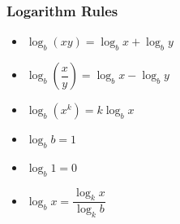 \subsubsection{Logarithm Rules}
\vspace{2.5mm}
\begin{itemize}
    \item $\log_b(xy) = \log_b x + \log_b y$
    \item $\log_b\left(\dfrac{x}{y}\right) = \log_b x - \log_b y$
    \item $\log_b(x^k) = k \log_b x$
    \item $\log_b b = 1$
    \item $\log_b 1 = 0$
    \item $\log_b x = \dfrac{\log_k x}{\log_k b}$
\end{itemize}

